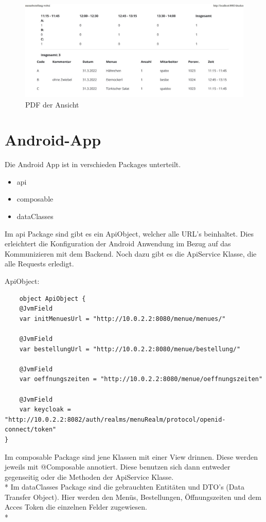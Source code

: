 \begin{figure}[htp]
    \centering
    \includegraphics[scale=0.45]{pics/pdf_ansicht.JPG}
    \caption{PDF der Ansicht}
    \label{fig:impl:CantinePrintPDF}
\end{figure}
\pagebreak

\section{Android-App}
Die Android App ist in verschieden Packages unterteilt. 

\begin{itemize}
    \item api
    \item composable 
    \item dataClasses
\end{itemize}

Im api Package sind gibt es ein ApiObject, welcher alle URL's beinhaltet. Dies erleichtert die Konfiguration der Android Anwendung im Bezug auf das Kommunizieren mit dem Backend.
Noch dazu gibt es die ApiService Klasse, die alle Requests erledigt. 


ApiObject:
\begin{lstlisting}
    object ApiObject {
    @JvmField
    var initMenuesUrl = "http://10.0.2.2:8080/menue/menues/"

    @JvmField
    var bestellungUrl = "http://10.0.2.2:8080/menue/bestellung/"

    @JvmField
    var oeffnungszeiten = "http://10.0.2.2:8080/menue/oeffnungszeiten"

    @JvmField
    var keycloak = "http://10.0.2.2:8082/auth/realms/menuRealm/protocol/openid-connect/token"
}
\end{lstlisting}



Im composable Package sind jene Klassen mit einer View drinnen. Diese werden jeweils mit @Composable annotiert. Diese benutzen sich dann
entweder gegenseitig oder die Methoden der ApiService Klasse.
\\*
Im dataClasses Package sind die gebrauchten Entitäten und DTO's (Data Transfer Object).
Hier werden den Menüs, Bestellungen, Öffnungszeiten und dem Acces Token die einzelnen Felder zugewiesen.
\\*

